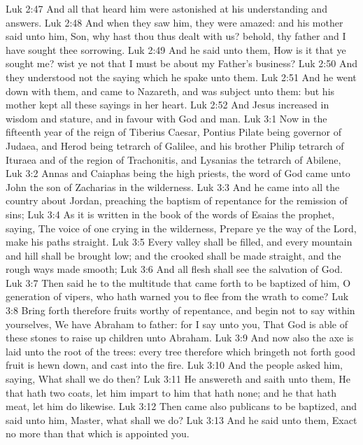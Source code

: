 \vs Luk 2:47 And all that heard him were astonished at his understanding and answers.
\vs Luk 2:48 And when they saw him, they were amazed: and his mother said unto him, Son, why hast thou thus dealt with us? behold, thy father and I have sought thee sorrowing.
\vs Luk 2:49 And he said unto them, How is it that ye sought me? wist ye not that I must be about my Father's business?
\vs Luk 2:50 And they understood not the saying which he spake unto them.
\vs Luk 2:51 And he went down with them, and came to Nazareth, and was subject unto them: but his mother kept all these sayings in her heart.
\vs Luk 2:52 And Jesus increased in wisdom and stature, and in favour with God and man.
\vs Luk 3:1 Now in the fifteenth year of the reign of Tiberius Caesar, Pontius Pilate being governor of Judaea, and Herod being tetrarch of Galilee, and his brother Philip tetrarch of Ituraea and of the region of Trachonitis, and Lysanias the tetrarch of Abilene,
\vs Luk 3:2 Annas and Caiaphas being the high priests, the word of God came unto John the son of Zacharias in the wilderness.
\vs Luk 3:3 And he came into all the country about Jordan, preaching the baptism of repentance for the remission of sins;
\vs Luk 3:4 As it is written in the book of the words of Esaias the prophet, saying, The voice of one crying in the wilderness, Prepare ye the way of the Lord, make his paths straight.
\vs Luk 3:5 Every valley shall be filled, and every mountain and hill shall be brought low; and the crooked shall be made straight, and the rough ways  made smooth;
\vs Luk 3:6 And all flesh shall see the salvation of God.
\vs Luk 3:7 Then said he to the multitude that came forth to be baptized of him, O generation of vipers, who hath warned you to flee from the wrath to come?
\vs Luk 3:8 Bring forth therefore fruits worthy of repentance, and begin not to say within yourselves, We have Abraham to  father: for I say unto you, That God is able of these stones to raise up children unto Abraham.
\vs Luk 3:9 And now also the axe is laid unto the root of the trees: every tree therefore which bringeth not forth good fruit is hewn down, and cast into the fire.
\vs Luk 3:10 And the people asked him, saying, What shall we do then?
\vs Luk 3:11 He answereth and saith unto them, He that hath two coats, let him impart to him that hath none; and he that hath meat, let him do likewise.
\vs Luk 3:12 Then came also publicans to be baptized, and said unto him, Master, what shall we do?
\vs Luk 3:13 And he said unto them, Exact no more than that which is appointed you.

